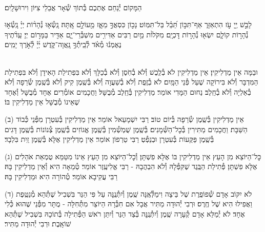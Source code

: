 \documentclass[twoside, openany, parskip=half, 11pt]{book}
\begin{document}
\begin{sometimes}

\\
הַמָּקוֹם יְ֯נַחֵם אֶתְכֶם בְּ֯תוֹךְ שְׁ֯אָר אֲבֵלֵי צִיּוֹן וִירוּשָׁלָֽיִם׃

\end{sometimes}


\mizmorshabbat

לָבֵ֣שׁ יְ֖יָ עֹ֣ז הִתְאַזָּר֑ אַף־תִּכּ֣וֹן תֵּ֝בֵ֗ל בַּל־תִּמּֽוֹט׃
נָכ֣וֹן כִּסְאֲךָ֣ מֵאָ֑ז מֵ֖עוֹלָ֣ם אׇֽתָּה׃
נָֽשְׂ֯א֤וּ נְ֯הָר֨וֹת יְיָ֗ נָֽשְׂ֯א֣וּ נְ֯הָר֣וֹת קוֹלָ֑ם יִשְׂא֖וּ נְ֯הָר֣וֹת דׇּכְיָֽם׃
מִקֹּלוֹ֨ת מַ֤יִם רַבִּים אַדִּירִ֥ים מִשְׁבְּ֯רֵי־יָ֑ם אַדִּ֖יר בַּמָּר֣וֹם יְיָ׃
עֵֽדֹ֨תֶיךָ נֶאֶמְנ֬וּ מְ֯אֹ֗ד לְ֯בֵֽיתְ֯ךָ֥ נָֽאֲוָה־קֹּ֑דֶשׁ יְ֜יָ֗ לְ֯אֹ֣רֶךְ יָמִֽים׃

\mournerskaddish


\\
וּבַמָּה אֵין מַדְלִיקִין׃ אֵין מַדְלִיקִין לֹא בְ֯לֶֽכֶשׁ וְ֯לֹא בְ֯חֹֽסֶן וְ֯לֹא בְ֯כַלָּךְ וְ֯לֹא בִּפְתִילַת הָאִידָן וְ֯לֹא בִּפְתִילַת הַמִּדְבָּר וְ֯לֹא בִּירוֹקָה שֶׁעַל פְּ֯נֵי הַמָּֽיִם׃ לֹא בְ֯זֶֽפֶת וְ֯לֹא בְ֯שַׁעֲוָה וְ֯לֹא בְּ֯שֶֽׁמֶן קִיק וְ֯לֹא בְּ֯שֶֽׁמֶן שְׂ֯רֵפָה וְ֯לֹא בְ֯אַלְיָה וְ֯לֹא בְ֯חֵֽלֶב׃ נַחוּם הַמָּדִי אוֹמֵר׃ מַדְלִיקִין בְּ֯חֵֽלֶב מְ֯בֻשָּׁל׃ וַחֲכָמִים אוֹמְ֯רִים׃ אֶחָד מְ֯בֻשָּׁל וְ֯אֶחָד שֶׁאֵינוֹ מְ֯בֻשָּׁל אֵין מַדְלִיקִין בּוֹ׃

(ב) אֵין מַדְלִיקִין בְּ֯שֶֽׁמֶן שְׂ֯רֵפָה בְּ֯יוֹם טוֹב׃ רַבִּי יִשְׁמָעֵאל אוֹמֵר׃ אֵין מַדְלִיקִין בְּ֯עִטְרָן מִפְּ֯נֵי כְּ֯בוֹד הַשַּׁבָּת׃ וַחֲכָמִים מַתִּירִין בְּ֯כׇל־הַשְּׁ֯מָנִים׃ בְּ֯שֶֽׁמֶן שֻׁמְשְׁ֯מִין בְּ֯שֶֽׁמֶן אֱגוֹזִים בְּ֯שֶֽׁמֶן צְ֯נוֹנוֹת בְּ֯שֶֽׁמֶן דָּגִים בְּ֯שֶֽׁמֶן פַּקֻּעוֹת בְּ֯עִטְרָן וּבְנֵפְ֯טְ׃ רַבִּי טַרְפוֹן אוֹמֵר׃ אֵין מַדְלִיקִין אֶלָּא בְּ֯שֶֽׁמֶן זַֽיִת בִּלְבָד׃

(ג) כׇּל־הַיּוֹצֵא מִן הָעֵץ אֵין מַדְלִיקִין בּוֹ אֶלָּא פִשְׁתָּן׃ וְ֯כׇל־הַיּוֹצֵא מִן הָעֵץ אֵינוֹ מִטַּמֵּא טֻמְאַת אֹהָלִים אֶלָּא פִשְׁתָּן׃ פְּ֯תִילַת הַבֶּֽגֶד שֶׁקִּפְּ֯לָהּ וְ֯לֹא הִבְהֲבָהּ - רַבִּי אֱלִיעֶֽזֶר אוֹמֵר׃ טְ֯מֵאָה הִיא וְ֯אֵין מַדְלִיקִין בָּהּ׃ רַבִּי עֲקִיבָא אוֹמֵר׃ טְ֯הוֹרָה הִיא וּמַדְלִיקִין בָּהּ׃

(ד) לֹא יִקּוֹב אָדָם שְׁ֯פוֹפֶֽרֶת שֶׁל בֵּיצָה וִימַלְּ֯אֶֽנָּה שֶֽׁמֶן וְ֯יִתְּ֯נֶֽנָּה עַל פִּי הַנֵּר בִּשְׁבִיל שֶׁתְּ֯הֵא מְ֯נַטֶּֽפֶת וַאֲפִילוּ הִיא שֶׁל חֶֽרֶס׃ וּרְבִי יְ֯הוּדָה מַתִּיר אֲבָל אִם חִבְּ֯רָהּ הַיּוֹצֵר מִתְּ֯חִלָּה - מֻתָּר מִפְּ֯נֵי שֶׁהוּא כְּ֯לִי אֶחָד׃ לֹא יְ֯מַלֵּא אָדָם קְ֯עָרָה שֶֽׁמֶן וְ֯יִתְּ֯נֶֽנָּה בְּ֯צַד הַנֵּר וְ֯יִתֵּן רֹאשׁ הַפְּ֯תִילָה בְּ֯תוֹכָהּ בִּשְׁבִיל שֶׁתְּ֯הֵא שׁוֹאָֽבֶת׃ וּרְבִי יְ֯הוּדָה מַתִּיר׃
\end{document}
